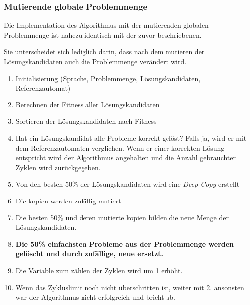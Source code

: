 \subsubsection{Mutierende globale Problemmenge}
Die Implementation des Algorithmus mit der mutierenden globalen Problemmenge ist nahezu identisch mit der zuvor beschriebenen.

Sie unterscheidet sich lediglich darin, dass nach dem mutieren der Lösungskandidaten auch die Problemmenge verändert wird.

\begin{enumerate}
\item Initialisierung (Sprache, Problemmenge, Lösungskandidaten, Referenzautomat)
\item Berechnen der Fitness aller Lösungskandidaten
\item Sortieren der Lösungskandidaten nach Fitness
\item Hat ein Lösungskandidat alle Probleme korrekt gelöst? Falls ja, wird er mit dem Referenzautomaten verglichen. Wenn er einer korrekten Lösung entspricht wird der Algorithmus angehalten und die Anzahl gebrauchter Zyklen wird zurückgegeben.
\item Von den besten 50\% der Lösungskandidaten wird eine \textit{Deep Copy} erstellt
\item Die kopien werden zufällig mutiert
\item Die besten 50\% und deren mutierte kopien bilden die neue Menge der Lösungskandidaten.
\item \textbf{Die 50\% einfachsten Probleme aus der Problemmenge werden gelöscht und durch zufällige, neue ersetzt.}
\item Die Variable zum zählen der Zyklen wird um 1 erhöht.
\item Wenn das Zykluslimit noch nicht überschritten ist, weiter mit 2. ansonsten war der Algorithmus nicht erfolgreich und bricht ab.
\end{enumerate}